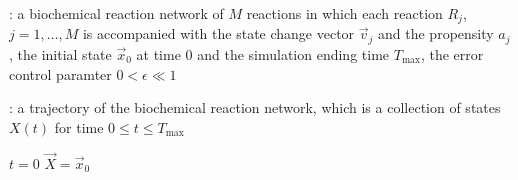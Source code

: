 
\begin{algorithm}[H]
\DontPrintSemicolon
{}

\caption{\protect\TitleFunction{}}
\label{algo:cle}

\Input: a biochemical reaction network of $M$ reactions in which each reaction $R_j$, $j=1, \dots, M$ is accompanied with the state change vector $\vec{v}_j$ and the propensity $a_j$, the initial state $\vec{x}_0$ at time $0$ and the simulation ending time $T_{\max}$, the error control paramter $0<\epsilon\ll 1$\;

\Output: a trajectory of the biochemical reaction network, which is a collection of states $X(t)$ for time $0\le t\le T_{\max}$\;

$t = 0$\;
$\vec{X} = \vec{x}_0$\;


\end{algorithm}
